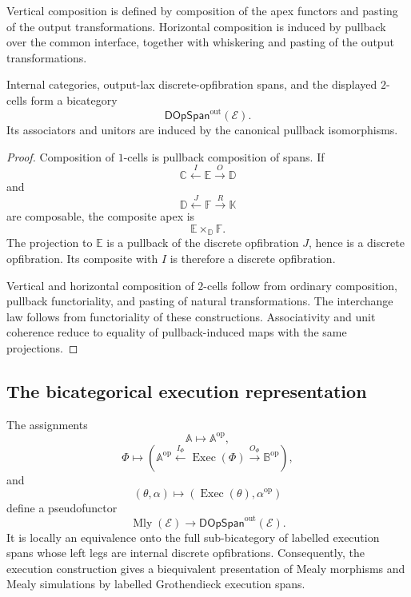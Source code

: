Vertical composition is defined by composition of the apex functors and
pasting of the output transformations. Horizontal composition is induced by
pullback over the common interface, together with whiskering and pasting of
the output transformations.

\begin{proposition}
\label{prop:bicategory-labelled-execution-spans}
Internal categories, output-lax discrete-opfibration spans, and the displayed
\(2\)-cells form a bicategory
\[
    \mathsf{DOpSpan}^{\mathrm{out}}(\mathcal E).
\]
Its associators and unitors are induced by the canonical pullback
isomorphisms.
\end{proposition}

\begin{proof}
Composition of \(1\)-cells is pullback composition of spans. If
\[
    \mathbb C\xleftarrow{I}\mathbb E\xrightarrow{O}\mathbb D
\]
and
\[
    \mathbb D\xleftarrow{J}\mathbb F\xrightarrow{R}\mathbb K
\]
are composable, the composite apex is
\[
    \mathbb E\times_{\mathbb D}\mathbb F.
\]
The projection to \(\mathbb E\) is a pullback of the discrete opfibration
\(J\), hence is a discrete opfibration. Its composite with \(I\) is
therefore a discrete opfibration.

Vertical and horizontal composition of \(2\)-cells follow from ordinary
composition, pullback functoriality, and pasting of natural transformations.
The interchange law follows from functoriality of these constructions.
Associativity and unit coherence reduce to equality of pullback-induced maps
with the same projections.
\end{proof}

\subsection{The bicategorical execution representation}
\label{subsec:bicategorical-execution-representation}

\begin{theorem}
\label{thm:bicategorical-grothendieck-execution}
The assignments
\[
    \mathbb A\longmapsto\mathbb A^{\mathrm{op}},
\]
\[
    \Phi\longmapsto
    \left(
        \mathbb A^{\mathrm{op}}
        \xleftarrow{I_\Phi}
        \operatorname{Exec}(\Phi)
        \xrightarrow{O_\Phi}
        \mathbb B^{\mathrm{op}}
    \right),
\]
and
\[
    (\theta,\alpha)
    \longmapsto
    \left(
        \operatorname{Exec}(\theta),
        \alpha^{\mathrm{op}}
    \right)
\]
define a pseudofunctor
\[
    \operatorname{Mly}(\mathcal E)
    \longrightarrow
    \mathsf{DOpSpan}^{\mathrm{out}}(\mathcal E).
\]
It is locally an equivalence onto the full sub-bicategory of labelled
execution spans whose left legs are internal discrete opfibrations.
Consequently, the execution construction gives a biequivalent presentation
of Mealy morphisms and Mealy simulations by labelled Grothendieck execution
spans.
\end{theorem}

